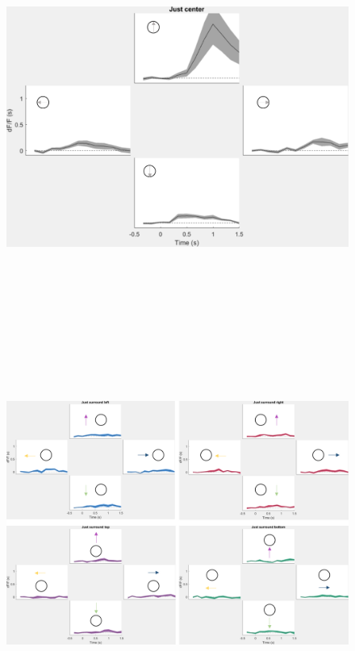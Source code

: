 \begin{figure}[H] \centering \includegraphics[width=12.5cm,height=12.5cm,keepaspectratio]{Figures/7.Results/individualSM/roi 29 mf379 pos5/justcenter.png} 
\end{figure}

\begin{figure}[H] \centering \includegraphics[width=12.5cm,height=12.5cm,keepaspectratio]{Figures/7.Results/individualSM/roi 29 mf379 pos5/justsurrscol.png} 
\end{figure}

